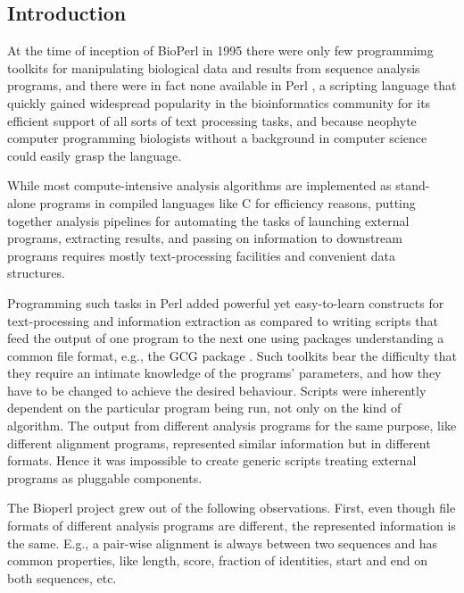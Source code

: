 \documentclass{article}
\begin{document}
\begin{twocolumn}
\begin{abstract}
{\bf Availability:} BioPerl is available as open-source software free
of charge at http://www.bioperl.org/.

\end{abstract}

\section{Introduction}

At the time of inception of BioPerl in 1995 \cite{Fullen1995}
there were only few programmimg toolkits for manipulating biological
data and results from sequence analysis programs, and there were in
fact none available in Perl \cite{Wall2000}, a scripting language that
quickly gained widespread popularity in the bioinformatics community
for its efficient support of all sorts of text processing tasks, and
because neophyte computer programming biologists without a background
in computer science could easily grasp the language.

While most compute-intensive analysis algorithms are implemented as
stand-alone programs in compiled languages like C for efficiency
reasons, putting together analysis pipelines for automating the tasks
of launching external programs, extracting results, and passing on
information to downstream programs requires mostly text-processing
facilities and convenient data structures.

Programming such tasks in Perl added powerful yet easy-to-learn
constructs for text-processing and information extraction as compared
to writing scripts that feed the output of one program to the next one
using packages understanding a common file format, e.g., the GCG
package \cite{Devereux1984}.  Such toolkits bear the difficulty that they
require an intimate knowledge of the programs' parameters, and how
they have to be changed to achieve the desired behaviour.  Scripts were
inherently dependent on the particular program being run, not only on
the kind of algorithm.  The output from different analysis programs for
the same purpose, like different alignment programs, represented
similar information but in different formats.  Hence it was impossible
to create generic scripts treating external programs as pluggable
components.

The Bioperl project grew out of the following observations.  First,
even though file formats of different analysis programs are different,
the represented information is the same.  E.g., a pair-wise alignment
is always between two sequences and has common properties, like
length, score, fraction of identities, start and end on both
sequences, etc. 


\end{twocolumn}
\end{document}
